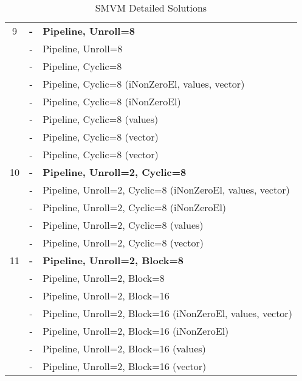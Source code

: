 \begin{table}[H]
\begin{tabular}{|c|c|l|}
		9 & \textbf{-} & \textbf{Pipeline, Unroll=8} \\
		& \footnotesize{-} & \footnotesize{Pipeline, Unroll=8} \\
		& \footnotesize{-} & \footnotesize{Pipeline, Cyclic=8} \\
		& \scriptsize{-} & \tabitem\scriptsize{Pipeline, Cyclic=8 (iNonZeroEl, values, vector)} \\
		& \scriptsize{-} & \tabitem\scriptsize{Pipeline, Cyclic=8 (iNonZeroEl)} \\
		& \scriptsize{-} & \tabitem\scriptsize{Pipeline, Cyclic=8 (values)} \\
		& \scriptsize{-} & \tabitem\scriptsize{Pipeline, Cyclic=8 (vector)} \\
		& \footnotesize{-} & \footnotesize{Pipeline, Cyclic=8 (vector)} \\
		\hline
		
		10 & \textbf{-} & \textbf{Pipeline, Unroll=2, Cyclic=8} \\
		& - & \tabitem\scriptsize{Pipeline, Unroll=2, Cyclic=8 (iNonZeroEl, values, vector)} \\
		& \scriptsize{-} & \tabitem\scriptsize{Pipeline, Unroll=2, Cyclic=8 (iNonZeroEl)} \\
		& \scriptsize{-} & \tabitem\scriptsize{Pipeline, Unroll=2, Cyclic=8 (values)} \\
		& \scriptsize{-} & \tabitem\scriptsize{Pipeline, Unroll=2, Cyclic=8 (vector)} \\
		\hline
		
		11 & \textbf{-} & \textbf{Pipeline, Unroll=2, Block=8} \\
		& \footnotesize{-} & \footnotesize{Pipeline, Unroll=2, Block=8} \\
		& \footnotesize{-} & \footnotesize{Pipeline, Unroll=2, Block=16} \\
		& \scriptsize{-} & \tabitem\scriptsize{Pipeline, Unroll=2, Block=16 (iNonZeroEl, values, vector)} \\
		& \scriptsize{-} & \tabitem\scriptsize{Pipeline, Unroll=2, Block=16 (iNonZeroEl)} \\
		& \scriptsize{-} & \tabitem\scriptsize{Pipeline, Unroll=2, Block=16 (values)} \\
		& \scriptsize{-} & \tabitem\scriptsize{Pipeline, Unroll=2, Block=16 (vector)} \\
		\hline
		
	\end{tabular}
	\caption{SMVM Detailed Solutions}
	\label{tab:smvm-detailed-solutions}
\end{table}

